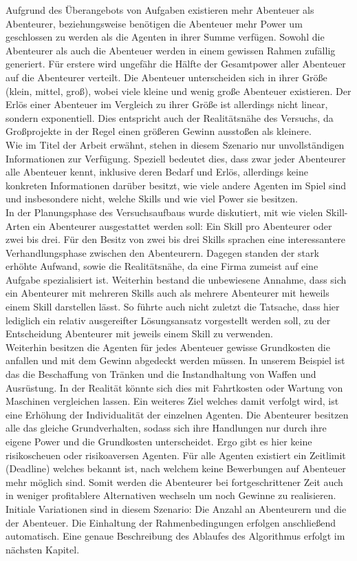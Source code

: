 \documentclass[fleqn,10pt]{SelfArx} %
\begin{document}
Aufgrund des Überangebots von Aufgaben existieren mehr Abenteuer als Abenteurer, beziehungsweise benötigen die Abenteuer mehr Power um geschlossen zu werden als die Agenten in ihrer Summe verfügen. Sowohl die Abenteurer als auch die Abenteuer werden in einem gewissen Rahmen zufällig generiert. Für erstere wird ungefähr die Hälfte der Gesamtpower aller Abenteuer auf die Abenteurer verteilt. Die Abenteuer unterscheiden sich in ihrer Größe (klein, mittel, groß), wobei viele kleine und wenig große Abenteuer existieren. Der Erlös einer Abenteuer im Vergleich zu ihrer Größe ist allerdings nicht linear, sondern exponentiell. Dies entspricht auch der Realitätsnähe des Versuchs, da Großprojekte in der Regel einen größeren Gewinn ausstoßen als kleinere.\\
Wie im Titel der Arbeit erwähnt, stehen in diesem Szenario nur unvollständigen Informationen zur Verfügung. Speziell bedeutet dies, dass zwar jeder Abenteurer alle Abenteuer kennt, inklusive deren Bedarf und Erlös, allerdings keine konkreten Informationen darüber besitzt, wie viele andere Agenten im Spiel sind und insbesondere nicht, welche Skills und wie viel Power sie besitzen.\\ 
In der Planungsphase des Versuchsaufbaus wurde diskutiert, mit wie vielen Skill-Arten ein Abenteurer ausgestattet werden soll: Ein Skill pro Abenteurer oder zwei bis drei. Für den Besitz von zwei bis drei Skills sprachen eine interessantere Verhandlungsphase zwischen den Abenteurern. Dagegen standen der stark erhöhte Aufwand, sowie die Realitätsnähe, da eine Firma zumeist auf eine Aufgabe spezialisiert ist. Weiterhin bestand die unbewiesene Annahme, dass sich ein Abenteurer mit mehreren Skills auch als mehrere Abenteurer mit heweils einem Skill darstellen lässt. So führte auch nicht zuletzt die Tatsache, dass hier lediglich ein relativ ausgereifter Lösungsansatz vorgestellt werden soll, zu der Entscheidung Abenteurer mit jeweils einem Skill zu verwenden. \\

Weiterhin besitzen die Agenten für jedes Abenteuer gewisse Grundkosten die anfallen und mit dem Gewinn abgedeckt werden müssen. In unserem Beispiel ist das die Beschaffung von Tränken und die Instandhaltung von Waffen und Ausrüstung. In der Realität könnte sich dies mit Fahrtkosten oder Wartung von Maschinen vergleichen lassen. Ein weiteres Ziel welches damit verfolgt wird, ist eine Erhöhung der Individualität der einzelnen Agenten. Die Abenteurer besitzen alle das gleiche Grundverhalten, sodass sich ihre Handlungen nur durch ihre eigene Power und die Grundkosten unterscheidet. Ergo gibt es hier keine risikoscheuen oder risikoaversen Agenten. Für alle Agenten existiert ein Zeitlimit (Deadline) welches bekannt ist, nach welchem keine Bewerbungen auf Abenteuer mehr möglich sind. Somit werden die Abenteurer bei fortgeschrittener Zeit auch in weniger profitablere Alternativen wechseln um noch Gewinne zu realisieren.\\
Initiale Variationen sind in diesem Szenario: Die Anzahl an Abenteurern und die der Abenteuer. Die Einhaltung der Rahmenbedingungen erfolgen anschließend automatisch. Eine genaue Beschreibung des Ablaufes des Algorithmus erfolgt im nächsten Kapitel.\\
\end{document}
